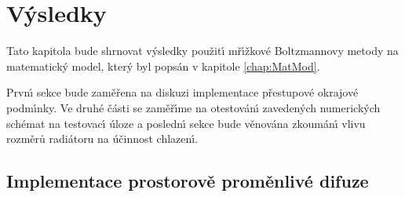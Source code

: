 
\chapter{Výsledky}
\label{chap:Res}

\pagestyle{plain}

    Tato kapitola bude shrnovat v\'{y}sledky pou\v{z}it\'{\i} m\v{r}\'{\i}\v{z}kov\'{e} Boltzmannovy metody na matematick\'{y} model, kter\'{y} byl pops\'{a}n v kapitole \ref{chap:MatMod}. 
    
    Prvn\'{\i} sekce bude zam\v{e}\v{r}ena na diskuzi implementace p\v{r}estupov\'{e} okrajov\'{e} podm\'{\i}nky. Ve druh\'{e} \v{c}\'{a}sti se zam\v{e}\v{r}\'{\i}me na otestov\'{a}n\'{\i} zaveden\'{y}ch numerick\'{y}ch sch\'{e}mat na testovac\'{\i} \'{u}loze a posledn\'{\i} sekce bude v\v{e}nov\'{a}na zkoum\'{a}n\'{\i} vlivu rozm\v{e}r\r{u} radi\'{a}toru na \'{u}\v{c}innost chlazen\'{\i}.



    \section{Implementace prostorov\v{e} prom\v{e}nliv\'{e} difuze}
    \label{sub:Prob01}

